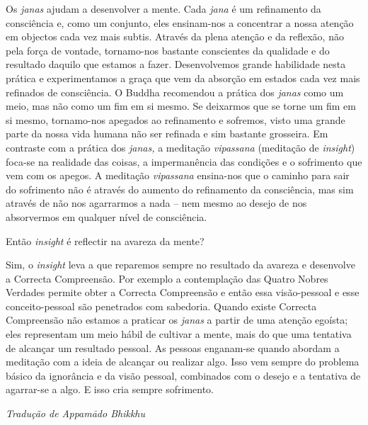  Os \emph{janas} ajudam a desenvolver a mente. Cada \emph{jana}
é um refinamento da consciência e, como um conjunto, eles ensinam-nos a
concentrar a nossa atenção em objectos cada vez mais subtis. Através da
plena atenção e da reflexão, não pela força de vontade, tornamo-nos
bastante conscientes da qualidade e do resultado daquilo que estamos a
fazer. Desenvolvemos grande habilidade nesta prática e experimentamos a
graça que vem da absorção em estados cada vez mais refinados de
consciência. O Buddha recomendou a prática dos \emph{janas} como um
meio, mas não como um fim em si mesmo. Se deixarmos que se torne um fim
em si mesmo, tornamo-nos apegados ao refinamento e sofremos, visto uma
grande parte da nossa vida humana não ser refinada e sim bastante
grosseira. Em contraste com a prática dos \emph{janas,} a meditação
\emph{vipassana} (meditação de \emph{insight}) foca-se na realidade das
coisas, a impermanência das condições e o sofrimento que vem com os
apegos. A meditação \emph{vipassana} ensina-nos que o caminho para sair
do sofrimento não é através do aumento do refinamento da consciência,
mas sim através de não nos agarrarmos a nada -- nem mesmo ao desejo de
nos absorvermos em qualquer nível de consciência.

\bigskip

 Então \emph{insight} é reflectir na avareza da mente?

 Sim, o \emph{insight} leva a que reparemos sempre no resultado
da avareza e desenvolve a Correcta Compreensão. Por exemplo a
contemplação das Quatro Nobres Verdades permite obter a Correcta
Compreensão e então essa visão-pessoal e esse conceito-pessoal são
penetrados com sabedoria. Quando existe Correcta Compreensão não estamos
a praticar os \emph{janas} a partir de uma atenção egoísta; eles
representam um meio hábil de cultivar a mente, mais do que uma tentativa
de alcançar um resultado pessoal. As pessoas enganam-se quando abordam a
meditação com a ideia de alcançar ou realizar algo. Isso vem sempre do
problema básico da ignorância e da visão pessoal, combinados com o
desejo e a tentativa de agarrar-se a algo. E isso cria sempre
sofrimento.

\bigskip

{\raggedleft\itshape
  Tradução de Appamādo Bhikkhu
\par}